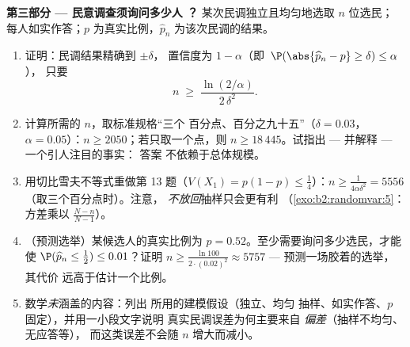\begin{problem}
\medskip
\noindent\textbf{第三部分 --- 民意调查须询问多少人
？} 某次民调独立且均匀地选取 $n$ 位选民；
每人如实作答；$p$ 为真实比例，$\widehat p_n$
为该次民调的结果。
\begin{enumerate}[resume]
  \item 证明：民调结果精确到 $\pm\delta$，
        置信度为 $1 - \alpha$（即\
        $\P(\abs{\widehat p_n - p} \geq \delta) \leq \alpha$），
        只要
        \[
        n \;\geq\; \frac{\ln(2/\alpha)}{2\,\delta^2} .
        \]
  \item 计算所需的 $n$，取标准规格“三个
        百分点、百分之九十五”（$\delta
        = 0.03$，$\alpha = 0.05$）：$n \geq 2050$；若只取一个点，则
        $n \geq 18\,445$。试指出 --- 并解释 --- 一个引人注目的事实：
        答案
        不依赖于总体规模。
  \item 用切比雪夫不等式重做第 13 题（$V(X_1) = p(1-p)
        \leq \frac14$）：$n \geq \frac1{4\alpha\delta^2} =
        5556$（取三个百分点时）。注意，
        \emph{不放回}抽样只会更有利
        （\cref{exo:b2:randomvar:5}：方差乘以
        $\frac{N-n}{N-1}$）。
  \item （预测选举）某候选人的真实比例为 $p
        = 0.52$。至少需要询问多少选民，才能使
        $\P(\widehat p_n \leq \tfrac12) \leq 0.01$？证明 $n
        \geq \frac{\ln 100}{2\cdot(0.02)^2} \approx 5757$ ---
        预测一场胶着的选举，其代价
        远高于估计一个比例。
  \item 数学\emph{未}涵盖的内容：列出
        所用的建模假设（独立、均匀
        抽样、如实作答、$p$ 固定），并用一小段文字说明
        真实民调误差为何主要来自
        \emph{偏差}（抽样不均匀、无应答等），
        而这类误差不会随 $n$ 增大而减小。
\end{enumerate}


\end{problem}
